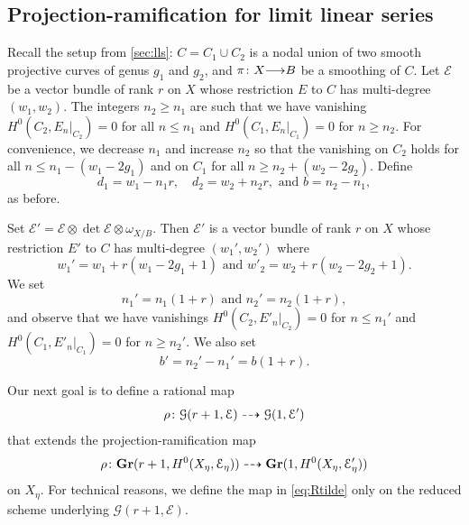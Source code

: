 \documentclass[11pt,reqno]{amsart}
\theoremstyle{plain}
\theoremstyle{definition}
\theoremstyle{remark}
\numberwithin{equation}{section}
\renewcommand{\to}{{\longrightarrow}}
\numberwithin{equation}{section}
\begin{document}
\subsection{Projection-ramification for limit linear series}
\label{sec:prlls}
Recall the setup from \autoref{sec:lls}: $C = C_1 \cup C_2$ is a nodal union of two smooth projective curves of genus $g_1$ and $g_2$, and $\pi \from X \to B$ be a smoothing of $C$.
Let $\mathcal E$ be a vector bundle of rank $r$ on $X$ whose restriction $E$ to $C$ has multi-degree $(w_1, w_2)$.
The integers $n_2 \geq n_1$ are such that we have vanishing $H^0(C_2, E_n|_{C_2}) = 0$ for all $n \leq n_1$ and $H^0(C_1, E_n|_{C_1}) = 0$ for $n \geq n_2$.
For convenience, we decrease $n_1$ and increase $n_2$ so that the vanishing on $C_2$ holds for all $n \leq n_1 - (w_1-2g_1)$ and on $C_1$ for all $n \geq n_2 + (w_2-2g_2)$.
Define
\[ d_1 = w_1 - n_1r, \quad d_2 = w_2 + n_2r,\text{ and } b = n_2 - n_1,\]
as before.

Set $\mathcal E' = \mathcal E \otimes \det \mathcal E \otimes \omega_{X/B}$.
Then $\mathcal E'$ is a vector bundle of rank $r$ on $X$ whose restriction $E'$ to $C$ has multi-degree $(w_1', w_2')$ where
\[ w_1' = w_1 + r(w_1-2g_1+1) \text{ and } w'_2 = w_2 + r(w_2-2g_2+1).\]
We set
\[ n_1' = n_1(1+r) \text{ and } n_2' = n_2(1+r),\]
and observe that we have vanishings $H^0(C_2, E'_{n}|_{C_2}) = 0$ for $n \leq n_1'$ and $H^0(C_1, E'_{n}|_{C_1}) = 0$ for $n \geq n_2'$.
We also set
\[ b' = n_2' - n_1' = b(1+r).\]

Our next goal is to define a rational map
\begin{equation}\label{eq:Rtilde}
  \rho {\colon} {\mathcal G}(r+1, \mathcal E) \dashrightarrow {\mathcal G}(1, \mathcal E')
\end{equation}
that extends the projection-ramification map
\[
  \rho {\colon} {\bf Gr}(r+1, H^0(X_\eta, \mathcal E_\eta)) \dashrightarrow {\bf Gr}(1, H^0(X_\eta, \mathcal E'_\eta))
\]
on $X_\eta$.
For technical reasons, we define the map in \eqref{eq:Rtilde} only on the reduced scheme underlying ${\mathcal G}(r+1, \mathcal E)$.
\end{document}
